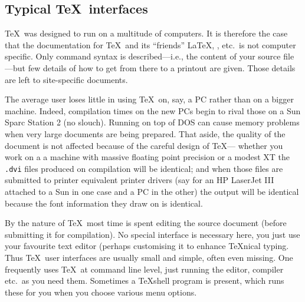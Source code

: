 \subsection{Typical \TeX\ interfaces}
\TeX\ was designed to run on a multitude of computers.  It is therefore
the case that the documentation for \TeX\ and its ``friends''
\LaTeX, \AmSTeX, etc.\ is not computer specific.  Only
command syntax is described---i.e., the content of your source file---but
few details of how to get from there to a printout are given.  Those details
are left to site-specific documents.

The average user loses little in using \TeX\ on, say, a PC rather than
on a bigger machine.  Indeed, compilation times on the
new PCs begin to rival those on a Sun Sparc
Station 2 (no slouch).  Running on top of DOS can cause memory problems
when very large documents are being prepared.  That aside, the quality
of the document is not affected because of the careful design of \TeX---%
whether you work on a a machine with massive floating point precision or
a modest XT the {\tt .dvi} files produced on compilation will be 
identical; and when those files are submitted to printer equivalent
printer drivers (say for an HP LaserJet III attached to a Sun in one case
and a PC in the other) the output will be identical because the font
information they draw on is identical.

By the nature of \TeX\ most time is spent editing the source document
(before submitting it for compilation).  No special interface is necessary
here, you just use your favourite text editor (perhaps customising it
to enhance {\TeX}nical typing.  Thus \TeX\ user interfaces are usually
small and simple, often even missing.  One frequently uses \TeX\ at
command line level, just running the editor, compiler etc.\ as you need them.
Sometimes a {\TeX}shell program is present, which runs these for you
when you choose various menu options.

